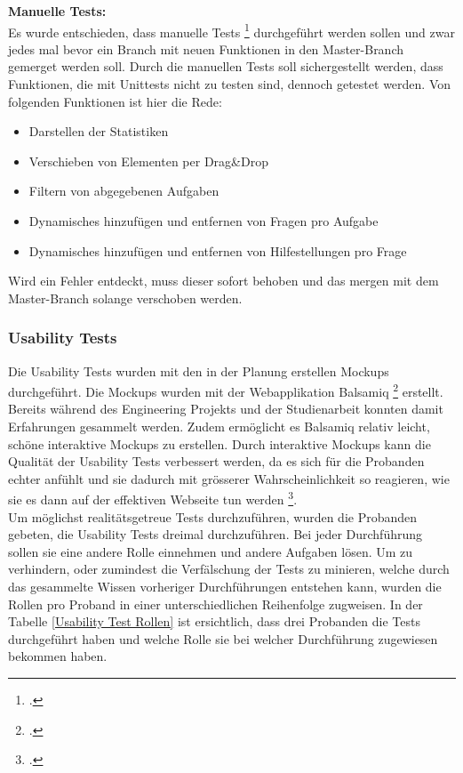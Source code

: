 \textbf{Manuelle Tests:} \\
Es wurde entschieden, dass manuelle Tests \footcite{manuelle_tests} durchgeführt werden sollen und zwar jedes mal bevor ein Branch mit neuen Funktionen in den Master-Branch gemerget werden soll. Durch die manuellen Tests soll sichergestellt werden, dass Funktionen, die mit Unittests nicht zu testen sind, dennoch getestet werden. Von folgenden Funktionen ist hier die Rede: \\
\begin{itemize}
	\item Darstellen der Statistiken
	\item Verschieben von Elementen per Drag\&Drop
	\item Filtern von abgegebenen Aufgaben
	\item Dynamisches hinzufügen und entfernen von Fragen pro Aufgabe
	\item Dynamisches hinzufügen und entfernen von Hilfestellungen pro Frage
\end{itemize}

Wird ein Fehler entdeckt, muss dieser sofort behoben und das mergen mit dem Master-Branch solange verschoben werden.


\subsubsection{Usability Tests}
Die Usability Tests wurden mit den in der Planung erstellen Mockups durchgeführt. Die Mockups wurden mit der Webapplikation Balsamiq \footcite{balsamiq_mockups} erstellt. Bereits während des Engineering Projekts und der Studienarbeit konnten damit Erfahrungen gesammelt werden. Zudem ermöglicht es Balsamiq relativ leicht, schöne interaktive Mockups zu erstellen. Durch interaktive Mockups kann die Qualität der Usability Tests verbessert werden, da es sich für die Probanden echter anfühlt und sie dadurch mit grösserer Wahrscheinlichkeit so reagieren, wie sie es dann auf der effektiven Webseite tun werden \footcite{interactive_mockups}. \\

Um möglichst realitätsgetreue Tests durchzuführen, wurden die Probanden gebeten, die Usability Tests dreimal durchzuführen. Bei jeder Durchführung sollen sie eine andere Rolle einnehmen und andere Aufgaben lösen. Um zu verhindern, oder zumindest die Verfälschung der Tests zu minieren, welche durch das gesammelte Wissen vorheriger Durchführungen entstehen kann, wurden die Rollen pro Proband in einer unterschiedlichen Reihenfolge zugweisen. In der Tabelle \ref{Usability Test Rollen} ist ersichtlich, dass drei Probanden die Tests durchgeführt haben und welche Rolle sie bei welcher Durchführung zugewiesen bekommen haben. \\

